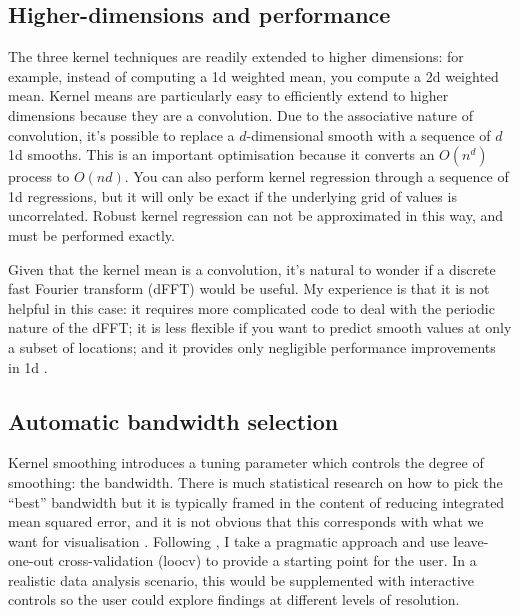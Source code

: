 \documentclass[journal]{vgtc}                %
\begin{document}
\subsection{Higher-dimensions and performance}

The three kernel techniques are readily extended to higher dimensions: for example, instead of computing a 1d weighted mean, you compute a 2d weighted mean. Kernel means are particularly easy to efficiently extend to higher dimensions  because they are a convolution. Due to the associative nature of convolution, it's possible to replace a $d$-dimensional smooth with a sequence of $d$ 1d smooths. This is an important optimisation because it converts an $O(n^d)$ process to $O(nd)$. You can also perform kernel regression through a sequence of 1d regressions, but it will only be exact if the underlying grid of values is uncorrelated. Robust kernel regression can not be approximated in this way, and must be performed exactly.

Given that the kernel mean is a convolution, it's natural to wonder if a discrete fast Fourier transform (dFFT) would be useful. My experience is that it is not helpful in this case: it requires more complicated code to deal with the periodic nature of the dFFT; it is less flexible if you want to predict smooth values at only a subset of locations; and it provides only negligible performance improvements in 1d \citep{wand:1994}.

% 

\subsection{Automatic bandwidth selection}

Kernel smoothing introduces a tuning parameter which controls the degree of smoothing: the bandwidth. There is much statistical research on how to pick the ``best'' bandwidth but it is typically framed in the content of reducing integrated mean squared error, and it is not obvious that this corresponds with what we want for visualisation \citep{denby:2009}. Following \citep{loader:1999}, I take a pragmatic approach and use leave-one-out cross-validation ({\sc loocv}) \citep{efron:1983} to provide a starting point for the user. In a realistic data analysis scenario, this would be supplemented with interactive controls so the user could explore findings at different levels of resolution.
\end{document}
